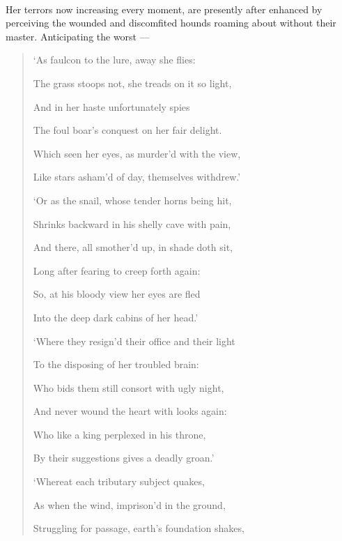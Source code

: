 \documentclass[a4paper, 11pt, oneside, polutonikogreek, english]{article}
\begin{document}
\paragraph{}
Her terrors now increasing every moment, are presently after enhanced by perceiving the wounded and discomfited hounds roaming about without their master. Anticipating the worst --- 
\begin{quotation}
`As faulcon to the lure, away she flies:

The grass stoops not, she treads on it so light,

And in her haste unfortunately spies

The foul boar's conquest on her fair delight.

\hspace*{15mm}Which seen her eyes, as murder'd with the view,

\hspace*{15mm}Like stars asham'd of day, themselves withdrew.'

\bigskip

`Or as the snail, whose tender horns being hit,

Shrinks backward in his shelly cave with pain,

And there, all smother'd up, in shade doth sit,

Long after fearing to creep forth again:

\hspace*{15mm}So, at his bloody view her eyes are fled

\hspace*{15mm}Into the deep dark cabins of her head.'

\bigskip

`Where they resign'd their office and their light

To the disposing of her troubled brain:

Who bids them still consort with ugly night,

And never wound the heart with looks again:

\hspace*{15mm}Who like a king perplexed in his throne,

\hspace*{15mm}By their suggestions gives a deadly groan.'

\bigskip

`Whereat each tributary subject quakes,

As when the wind, imprison'd in the ground,

Struggling for passage, earth's foundation shakes,


\end{quotation}
\end{document}
